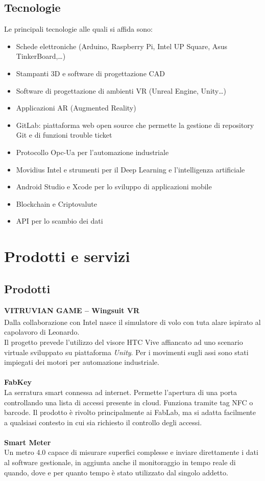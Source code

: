 \subsection{Tecnologie}
Le principali tecnologie alle quali \lab{} si affida sono:
\begin{itemize}
\item Schede elettroniche (Arduino, Raspberry Pi, Intel UP Square, Asus TinkerBoard,…)
\item Stampanti 3D e software di progettazione CAD
\item Software di progettazione di ambienti VR (Unreal Engine, Unity…)
\item Applicazioni AR (Augmented Reality)
\item GitLab: piattaforma web open source che permette la gestione di repository Git e di funzioni trouble ticket
\item Protocollo Opc-Ua per l’automazione industriale 
\item Movidius Intel e strumenti per il Deep Learning e l’intelligenza artificiale
\item Android Studio e Xcode per lo sviluppo di applicazioni mobile
\item Blockchain e Criptovalute 
\item API per lo scambio dei dati
\end{itemize}



\newpage
\section{Prodotti e servizi}
\subsection{Prodotti}
\textbf{VITRUVIAN GAME – Wingsuit VR}
\\
Dalla collaborazione con Intel\textsuperscript{\textregistered} nasce il simulatore di volo con tuta alare ispirato al capolavoro di Leonardo.\\
Il progetto prevede l'utilizzo del visore HTC Vive affiancato ad uno scenario virtuale sviluppato su piattaforma \textit{Unity}. Per i movimenti sugli assi sono stati impiegati dei motori per automazione industriale.
\\
\\
\textbf{FabKey}
\\
La serratura smart connessa ad internet. Permette l'apertura di una porta controllando una lista di accessi presente in cloud. Funziona tramite tag \gls{NFC} o barcode. Il prodotto è rivolto principalmente ai \gls{FabLab}, ma si adatta facilmente a qualsiasi contesto in cui sia richiesto il controllo degli accessi.
\\
\\
\textbf{Smart Meter}
\\
Un metro 4.0 capace di misurare superfici complesse e inviare direttamente i dati al software gestionale, in aggiunta anche il monitoraggio in tempo reale di quando, dove e per quanto tempo è stato utilizzato dal singolo addetto.


